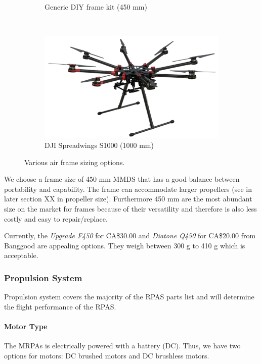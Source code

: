 \begin{figure}[H]
\begin{subfigure}[b]{0.33\textwidth}
        \caption{Generic DIY frame kit (450 mm)}
    \end{subfigure}
    ~
    \begin{subfigure}[b]{0.33\textwidth}
        \centering
        \includegraphics[width=\textwidth]{img/djis1000}
        \caption{DJI Spreadwings S1000 (1000 mm)}
    \end{subfigure}
    
    \caption{Various air frame sizing options. }
\end{figure}

We choose a frame size of 450 mm MMDS that has a good balance between portability and capability. The frame 
can accommodate larger propellers (see in later section XX in propeller size). Furthermore 450 mm are the 
most abundant size on the market for frames because of their versatility and therefore is also less costly 
and easy to repair/replace.

Currently, the \textit{Upgrade F450} for CA\$30.00 and \textit{Diatone Q450} for CA\$20.00 from Banggood are appealing options. They weigh between 300 g to 410 g which is acceptable.

\subsubsection{Propulsion System}

Propulsion system covers the majority of the RPAS parts list and will determine the flight performance of the RPAS. 

\paragraph{Motor Type}

The MRPAs is electrically powered with a battery (DC). Thus, we have two options for motors: DC brushed 
motors and DC brushless motors.

